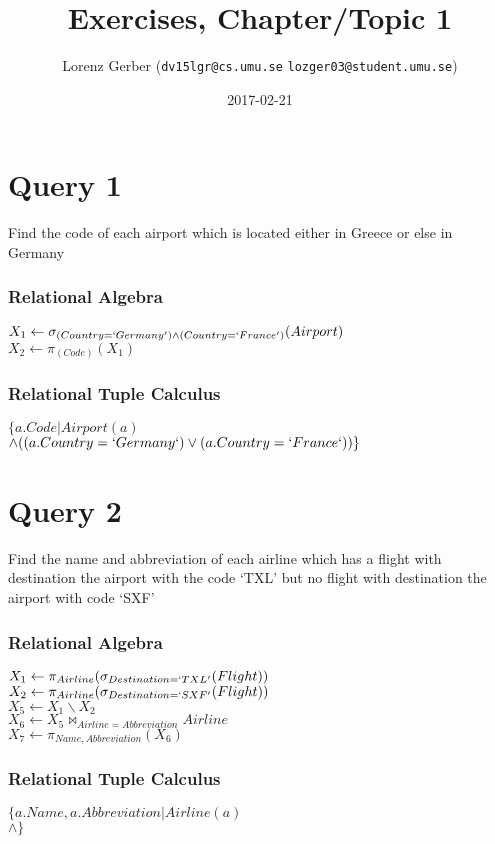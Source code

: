 \documentclass[a4paper,11pt,twoside]{article}
\title{Exercises, Chapter/Topic 1}
\author{Lorenz Gerber ({\tt{dv15lgr@cs.umu.se}} {\tt{lozger03@student.umu.se}})}
\date{2017-02-21}
\begin{document}
\lstset{language=C}
\maketitle
\thispagestyle{empty}
\newpage
\tableofcontents
\thispagestyle{empty}
\newpage

\clearpage
{}

\section{Query 1}
Find the code of each airport which is located either in Greece or else in Germany
\subsubsection*{Relational Algebra}
$X_1 \leftarrow \sigma_{(Country = `Germany') \land (Country = `France')}(Airport)$\\
$X_2 \leftarrow \pi_{(Code)}(X_1)$\\

\subsubsection*{Relational Tuple Calculus}
$\{a.Code|Airport(a)$\\
$\land((a.Country = `Germany`) \lor (a.Country = `France`))\}$

\section{Query 2}
Find the name and abbreviation of each airline which has a flight with destination the airport with the code `TXL' but no flight with destination the airport with code `SXF'
\subsubsection*{Relational Algebra}
$X_1 \leftarrow \pi_{Airline}(\sigma_{Destination=`TXL'}(Flight))$\\
$X_2 \leftarrow \pi_{Airline}(\sigma_{Destination=`SXF'}(Flight))$\\
$X_5 \leftarrow X_1 \backslash X_2$\\
$X_6 \leftarrow X_5 \Join_{Airline=Abbreviation} Airline$\\
$X_7 \leftarrow \pi_{Name, Abbreviation}(X_6)$\\

\subsubsection*{Relational Tuple Calculus}
$\{a.Name, a.Abbreviation|Airline(a)$\\
$\land \}$
\end{document}
